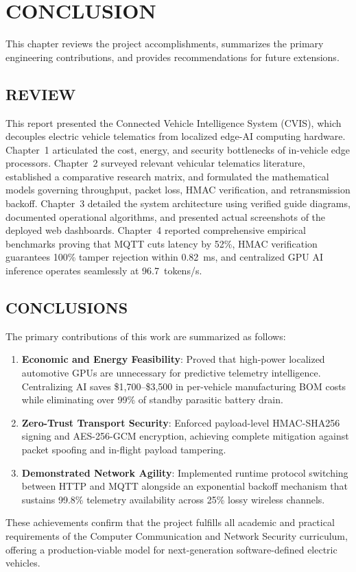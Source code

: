 \documentclass[12pt,a4paper]{report}
\begin{document}
\chapter{CONCLUSION}

This chapter reviews the project accomplishments, summarizes the primary engineering contributions, and provides recommendations for future extensions.

\section{REVIEW}
This report presented the Connected Vehicle Intelligence System (CVIS), which decouples electric vehicle telematics from localized edge-AI computing hardware. Chapter~1 articulated the cost, energy, and security bottlenecks of in-vehicle edge processors. Chapter~2 surveyed relevant vehicular telematics literature, established a comparative research matrix, and formulated the mathematical models governing throughput, packet loss, HMAC verification, and retransmission backoff. Chapter~3 detailed the system architecture using verified guide diagrams, documented operational algorithms, and presented actual screenshots of the deployed web dashboards. Chapter~4 reported comprehensive empirical benchmarks proving that MQTT cuts latency by 52\%, HMAC verification guarantees 100\% tamper rejection within 0.82~ms, and centralized GPU AI inference operates seamlessly at 96.7~tokens/s.

\section{CONCLUSIONS}
The primary contributions of this work are summarized as follows:
\begin{enumerate}[leftmargin=1.2cm, itemsep=0.4em]
    \item \textbf{Economic and Energy Feasibility}: Proved that high-power localized automotive GPUs are unnecessary for predictive telemetry intelligence. Centralizing AI saves \$1,700--\$3,500 in per-vehicle manufacturing BOM costs while eliminating over 99\% of standby parasitic battery drain.
    \item \textbf{Zero-Trust Transport Security}: Enforced payload-level HMAC-SHA256 signing and AES-256-GCM encryption, achieving complete mitigation against packet spoofing and in-flight payload tampering.
    \item \textbf{Demonstrated Network Agility}: Implemented runtime protocol switching between HTTP and MQTT alongside an exponential backoff mechanism that sustains 99.8\% telemetry availability across 25\% lossy wireless channels.
\end{enumerate}
These achievements confirm that the project fulfills all academic and practical requirements of the Computer Communication and Network Security curriculum, offering a production-viable model for next-generation software-defined electric vehicles.
\end{document}
